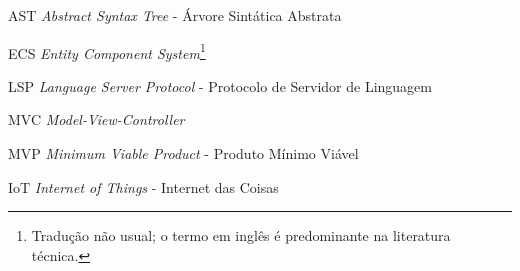 \begin{siglas}
	\item[AST] \textit{Abstract Syntax Tree} - Árvore Sintática Abstrata
	\item[ECS] \textit{Entity Component System}\footnote{Tradução não usual; o termo em inglês é predominante na literatura técnica.}
	\item[LSP] \textit{Language Server Protocol} - Protocolo de Servidor de Linguagem
	\item[MVC] \textit{Model-View-Controller}\footnotemark[1]
	\item[MVP] \textit{Minimum Viable Product} - Produto Mínimo Viável
	\item[IoT] \textit{Internet of Things} - Internet das Coisas
\end{siglas}
